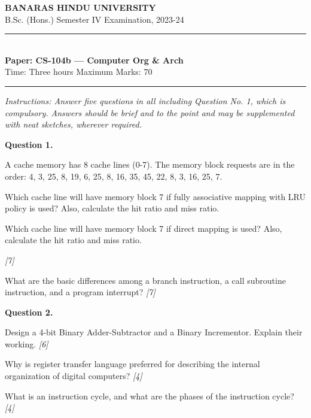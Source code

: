 \documentclass[11pt,a4paper]{article}
\newcommand{\pts}[1]{\hfill   \textit{[#1]}}
\begin{document}
\begin{center}
  {\large\bfseries BANARAS HINDU UNIVERSITY}\\[2pt]
  {\normalsize B.Sc. (Hons.) Semester IV Examination, 2023-24}\\[6pt]
  \rule{0.8\linewidth}{0.5pt}\\[6pt]
  {\large\bfseries Paper: CS-104b --- Computer Org \& Arch}\\[4pt]
  {\normalsize Time: Three hours \hfill Maximum Marks: 70}
\end{center}

\rule{\linewidth}{0.4pt}

\smallskip



\noindent   \textit{Instructions: Answer five questions in all including Question No. 1, which is compulsory. Answers should be brief and to the point and may be supplemented with neat sketches, wherever required.}

\bigskip

\medskip


\noindent   \textbf{Question 1.}

\begin{parts}
  \item A cache memory has 8 cache lines (0-7). The memory block requests are in the order: 4, 3, 25, 8, 19, 6, 25, 8, 16, 35, 45, 22, 8, 3, 16, 25, 7.
  
\begin{parts}
    \item Which cache line will have memory block 7 if fully associative mapping with LRU policy is used? Also, calculate the hit ratio and miss ratio.
    \item Which cache line will have memory block 7 if direct mapping is used? Also, calculate the hit ratio and miss ratio.
  \end{parts} \pts{7}
  \item What are the basic differences among a branch instruction, a call subroutine instruction, and a program interrupt? \pts{7}
\end{parts}

\medskip


\noindent   \textbf{Question 2.}

\begin{parts}
  \item Design a 4-bit Binary Adder-Subtractor and a Binary Incrementor. Explain their working. \pts{6}
  \item Why is register transfer language preferred for describing the internal organization of digital computers? \pts{4}
  \item What is an instruction cycle, and what are the phases of the instruction cycle? \pts{4}
\end{parts}
\end{document}
